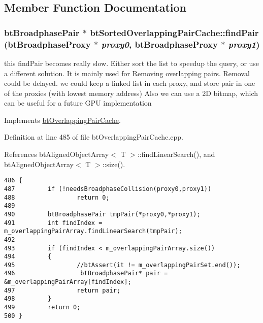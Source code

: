 \subsection{Member Function Documentation}
\hypertarget{classbt_sorted_overlapping_pair_cache_73b6665ffd9874f0575b72d07761ce8d}{
\subsubsection[findPair]{\setlength{\rightskip}{0pt plus 5cm}btBroadphasePair $\ast$ btSortedOverlappingPairCache::findPair (btBroadphaseProxy $\ast$ {\em proxy0}, \/  btBroadphaseProxy $\ast$ {\em proxy1})}}
\label{classbt_sorted_overlapping_pair_cache_73b6665ffd9874f0575b72d07761ce8d}


this findPair becomes really slow. Either sort the list to speedup the query, or use a different solution. It is mainly used for Removing overlapping pairs. Removal could be delayed. we could keep a linked list in each proxy, and store pair in one of the proxies (with lowest memory address) Also we can use a 2D bitmap, which can be useful for a future GPU implementation 

Implements \hyperlink{classbt_overlapping_pair_cache}{btOverlappingPairCache}.

Definition at line 485 of file btOverlappingPairCache.cpp.

References btAlignedObjectArray$<$ T $>$::findLinearSearch(), and btAlignedObjectArray$<$ T $>$::size().

\begin{Code}\begin{verbatim}486 {
487         if (!needsBroadphaseCollision(proxy0,proxy1))
488                 return 0;
489 
490         btBroadphasePair tmpPair(*proxy0,*proxy1);
491         int findIndex = m_overlappingPairArray.findLinearSearch(tmpPair);
492 
493         if (findIndex < m_overlappingPairArray.size())
494         {
495                 //btAssert(it != m_overlappingPairSet.end());
496                  btBroadphasePair* pair = &m_overlappingPairArray[findIndex];
497                 return pair;
498         }
499         return 0;
500 }
\end{verbatim}
\end{Code}




